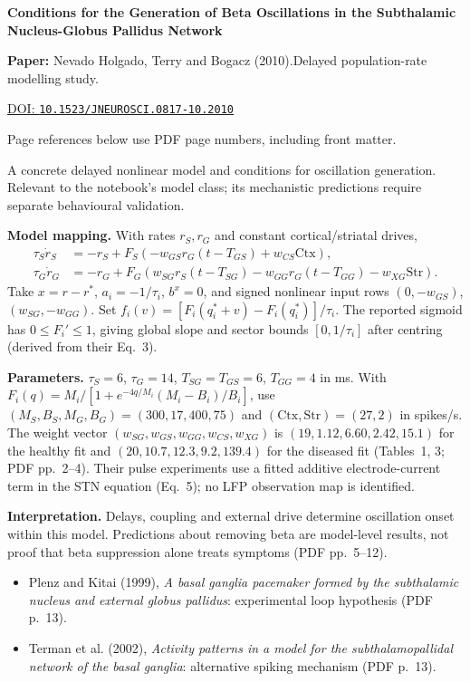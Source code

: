 

{\Large\bfseries Conditions for the Generation of Beta Oscillations in the Subthalamic Nucleus-Globus Pallidus Network\par}

\textbf{Paper:} Nevado Holgado, Terry and Bogacz (2010).\quad Delayed population-rate modelling study.\par
\href{https://doi.org/10.1523/JNEUROSCI.0817-10.2010}{DOI: \nolinkurl{10.1523/JNEUROSCI.0817-10.2010}}\par
{\footnotesize Page references below use PDF page numbers, including front matter.}

A concrete delayed nonlinear model and conditions for oscillation generation. Relevant to the notebook's model class; its mechanistic predictions require separate behavioural validation.

\textbf{Model mapping.} With rates $r_S,r_G$ and constant cortical/striatal drives,
\[
\begin{aligned}
\tau_S\dot r_S&=-r_S+F_S(-w_{GS}r_G(t-T_{GS})+w_{CS}\mathrm{Ctx}),\\
\tau_G\dot r_G&=-r_G+F_G(w_{SG}r_S(t-T_{SG})-w_{GG}r_G(t-T_{GG})-w_{XG}\mathrm{Str}).
\end{aligned}
\]
Take $x=r-r^*$, $a_i=-1/\tau_i$, $b^x=0$, and signed nonlinear input rows $(0,-w_{GS})$, $(w_{SG},-w_{GG})$. Set $f_i(v)=[F_i(q_i^*+v)-F_i(q_i^*)]/\tau_i$. The reported sigmoid has $0\leq F_i'\leq1$, giving global slope and sector bounds $[0,1/\tau_i]$ after centring (derived from their Eq.~3).

\textbf{Parameters.} $\tau_S=6$, $\tau_G=14$, $T_{SG}=T_{GS}=6$, $T_{GG}=4$ in ms. With $F_i(q)=M_i/[1+e^{-4q/M_i}(M_i-B_i)/B_i]$, use $(M_S,B_S,M_G,B_G)=(300,17,400,75)$ and $(\mathrm{Ctx},\mathrm{Str})=(27,2)$ in spikes/s. The weight vector $(w_{SG},w_{GS},w_{GG},w_{CS},w_{XG})$ is $(19,1.12,6.60,2.42,15.1)$ for the healthy fit and $(20,10.7,12.3,9.2,139.4)$ for the diseased fit (Tables~1, 3; PDF pp.~2--4). Their pulse experiments use a fitted additive electrode-current term in the STN equation (Eq.~5); no LFP observation map is identified.

\textbf{Interpretation.} Delays, coupling and external drive determine oscillation onset within this model. Predictions about removing beta are model-level results, not proof that beta suppression alone treats symptoms (PDF pp.~5--12).

\begin{itemize}
\item Plenz and Kitai (1999), \emph{A basal ganglia pacemaker formed by the subthalamic nucleus and external globus pallidus}: experimental loop hypothesis (PDF p.~13).
\item Terman et al. (2002), \emph{Activity patterns in a model for the subthalamopallidal network of the basal ganglia}: alternative spiking mechanism (PDF p.~13).
\end{itemize}


